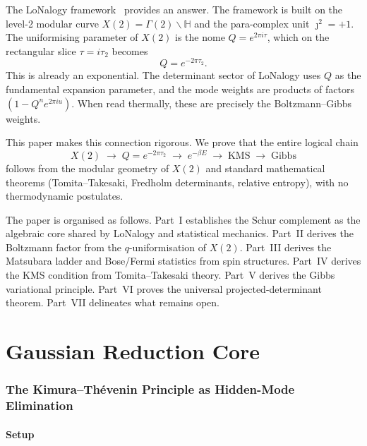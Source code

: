 \documentclass[12pt]{article}
\theoremstyle{plain}
\theoremstyle{definition}
\numberwithin{equation}{section}
\newcommand{\HH}{\mathbb{H}}
\begin{document}
The LoNalogy framework~\cite{LoNalogyv87,YMmassGap,ParticleCosmo}
provides an answer.  The framework is built on the level-2 modular
curve $X(2)=\Gamma(2)\backslash\HH$ and the para-complex unit
$\jmath^2=+1$.  The uniformising parameter of $X(2)$ is the nome
$Q=e^{2\pi i\tau}$, which on the rectangular slice $\tau=i\tau_2$
becomes
\begin{equation}
Q = e^{-2\pi\tau_2}.
\end{equation}
This is already an exponential.  The determinant sector of LoNalogy
uses $Q$ as the fundamental expansion parameter, and the mode weights
are products of factors $(1-Q^n e^{2\pi iu})$.  When read thermally,
these are precisely the Boltzmann--Gibbs weights.

This paper makes this connection rigorous.  We prove that the entire
logical chain
\begin{equation}
X(2) \;\to\; Q=e^{-2\pi\tau_2} \;\to\; e^{-\beta E}
\;\to\; \text{KMS} \;\to\; \text{Gibbs}
\end{equation}
follows from the modular geometry of $X(2)$ and standard mathematical
theorems (Tomita--Takesaki, Fredholm determinants, relative entropy),
with no thermodynamic postulates.

The paper is organised as follows.  Part~I establishes the Schur
complement as the algebraic core shared by LoNalogy and statistical
mechanics.  Part~II derives the Boltzmann factor from the
$q$-uniformisation of $X(2)$.  Part~III derives the Matsubara ladder
and Bose/Fermi statistics from spin structures.  Part~IV derives the
KMS condition from Tomita--Takesaki theory.  Part~V derives the Gibbs
variational principle.  Part~VI proves the universal projected-determinant
theorem.  Part~VII delineates what remains open.


\part{Gaussian Reduction Core}

\section{The Kimura--Th\'evenin Principle as Hidden-Mode Elimination}\label{sec:KT}

\subsection{Setup}
\end{document}

